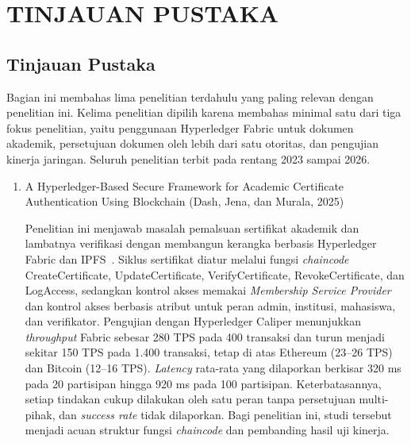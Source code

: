 \newpage
\chapter{TINJAUAN PUSTAKA} \label{Bab II}

\section{Tinjauan Pustaka}
Bagian ini membahas lima penelitian terdahulu yang paling relevan dengan penelitian ini. Kelima penelitian dipilih karena membahas minimal satu dari tiga fokus penelitian, yaitu penggunaan Hyperledger Fabric untuk dokumen akademik, persetujuan dokumen oleh lebih dari satu otoritas, dan pengujian kinerja jaringan. Seluruh penelitian terbit pada rentang 2023 sampai 2026.

\begin{enumerate}
    \item {A Hyperledger-Based Secure Framework for Academic Certificate Authentication Using Blockchain (Dash, Jena, dan Murala, 2025)}\par
    Penelitian ini menjawab masalah pemalsuan sertifikat akademik dan lambatnya verifikasi dengan membangun kerangka berbasis Hyperledger Fabric dan IPFS~\cite{Dash2025Hyperledger}. Siklus sertifikat diatur melalui fungsi \textit{chaincode} CreateCertificate, UpdateCertificate, VerifyCertificate, RevokeCertificate, dan LogAccess, sedangkan kontrol akses memakai \textit{Membership Service Provider} dan kontrol akses berbasis atribut untuk peran admin, institusi, mahasiswa, dan verifikator. Pengujian dengan Hyperledger Caliper menunjukkan \textit{throughput} Fabric sebesar 280 TPS pada 400 transaksi dan turun menjadi sekitar 150 TPS pada 1.400 transaksi, tetap di atas Ethereum (23--26 TPS) dan Bitcoin (12--16 TPS). \textit{Latency} rata-rata yang dilaporkan berkisar 320 ms pada 20 partisipan hingga 920 ms pada 100 partisipan. Keterbatasannya, setiap tindakan cukup dilakukan oleh satu peran tanpa persetujuan multi-pihak, dan \textit{success rate} tidak dilaporkan. Bagi penelitian ini, studi tersebut menjadi acuan struktur fungsi \textit{chaincode} dan pembanding hasil uji kinerja.


\end{enumerate}
